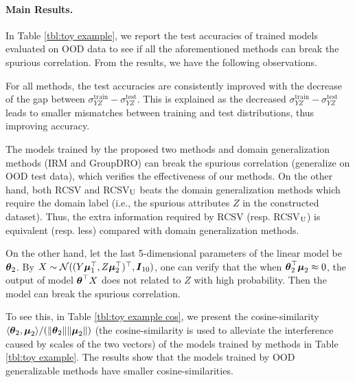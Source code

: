 \paragraph{Main Results.} In Table \ref{tbl:toy example}, we report the test accuracies of trained models evaluated on OOD data to see if all the aforementioned methods can break the spurious correlation. From the results, we have the following observations.
\par
For all methods, the test accuracies are consistently improved with the decrease of the gap between $\sigma_{YZ}^{\text{train}} - \sigma_{YZ}^{\text{test}}$. This is explained as the decreased $\sigma_{YZ}^{\text{train}} - \sigma_{YZ}^{\text{test}}$ leads to smaller mismatches between training and test distributions, thus improving accuracy. 
\par
The models trained by the proposed two methods and domain generalization methods (IRM and GroupDRO) can break the spurious correlation (generalize on OOD test data), which verifies the effectiveness of our methods. On the other hand, both RCSV and RCSV$_{\rm U}$ beats the domain generalization methods which require the domain label (i.e., the spurious attributes $Z$ in the constructed dataset). Thus, the extra information required by RCSV (resp. RCSV$_{\rm U}$) is equivalent (resp. less) compared with domain generalization methods.     
\par
On the other hand, let the last 5-dimensional parameters of the linear model be $\text{\boldmath{$\theta$}}_{2}$. By $X\sim\mathcal{N}((Y\text{\boldmath{$\mu$}}_{1}^{\top}, Z\text{\boldmath{$\mu$}}_{2}^{\top})^{\top}, \boldsymbol{I}_{10})$, one can verify that the when $\text{\boldmath{$\theta$}}_{2}^{\top}\text{\boldmath{$\mu$}}_{2}\approx 0$, the output of model $\text{\boldmath{$\theta$}}^{\top}X$ does not related to $Z$ with high probability. Then the model can break the spurious correlation. 
\par
To see this, in Table \ref{tbl:toy example cos}, we present the cosine-similarity $\langle \text{\boldmath{$\theta$}}_{2},\text{\boldmath{$\mu$}}_{2}\rangle / (\|\text{\boldmath{$\theta$}}_{2}\|\|\text{\boldmath{$\mu$}}_{2}\|)$ (the cosine-similarity is used to alleviate the interference caused by scales of the two vectors) of the models trained by methods in Table \ref{tbl:toy example}. The results show that the models trained by OOD generalizable methods have smaller cosine-similarities.
 
